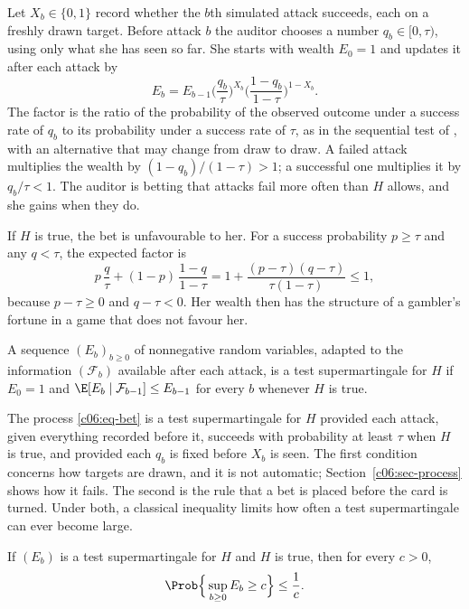 Let $X_b \in \{0,1\}$ record whether the $b$th simulated attack succeeds, each on a
freshly drawn target. Before attack $b$ the auditor chooses a number
$q_b \in [0, \tau)$, using only what she has seen so far. She starts with wealth
$E_0 = 1$ and updates it after each attack by
\begin{equation}\label{c06:eq-bet}
E_b = E_{b-1} \Big(\frac{q_b}{\tau}\Big)^{X_b}
\Big(\frac{1-q_b}{1-\tau}\Big)^{1-X_b} .
\end{equation}
The factor is the ratio of the probability of the observed outcome under a
success rate of $q_b$ to its probability under a success rate of $\tau$, as in the
sequential test of \citet{wald1945}, with an alternative that may change from draw
to draw. A failed attack multiplies the wealth by $(1-q_b)/(1-\tau) > 1$; a
successful one multiplies it by $q_b/\tau < 1$. The auditor is betting that attacks
fail more often than $H$ allows, and she gains when they do.

If $H$ is true, the bet is unfavourable to her. For a success probability $p \ge
\tau$ and any $q < \tau$, the expected factor is
\begin{equation}\label{c06:eq-factor}
p\,\frac{q}{\tau} + (1-p)\,\frac{1-q}{1-\tau}
= 1 + \frac{(p-\tau)(q-\tau)}{\tau(1-\tau)} \le 1 ,
\end{equation}
because $p - \tau \ge 0$ and $q - \tau < 0$. Her wealth then has the structure of
a gambler's fortune in a game that does not favour her.

\begin{definition}\label{c06:def-test}
A sequence $(E_b)_{b \ge 0}$ of nonnegative random variables, adapted to the
information $(\mathcal{F}_b)$ available after each attack, is a test
supermartingale for $H$ if $E_0 = 1$ and
$\E[E_b \mid \mathcal{F}_{b-1}] \le E_{b-1}$ for every $b$ whenever $H$ is true.
\end{definition}

The process \eqref{c06:eq-bet} is a test supermartingale for $H$ provided each
attack, given everything recorded before it, succeeds with probability at least
$\tau$ when $H$ is true, and provided each $q_b$ is fixed before $X_b$ is seen.
The first condition concerns how targets are drawn, and it is not automatic;
Section~\ref{c06:sec-process} shows how it fails. The second is the rule that a bet
is placed before the card is turned. Under both, a classical inequality limits how
often a test supermartingale can ever become large.

\begin{proposition}\label{c06:prop-ville}
If $(E_b)$ is a test supermartingale for $H$ and $H$ is true, then for every
$c > 0$,
\begin{equation}\label{c06:eq-ville}
\Prob\Big\{\sup_{b \ge 0} E_b \ge c\Big\} \le \frac{1}{c} .
\end{equation}
\end{proposition}

